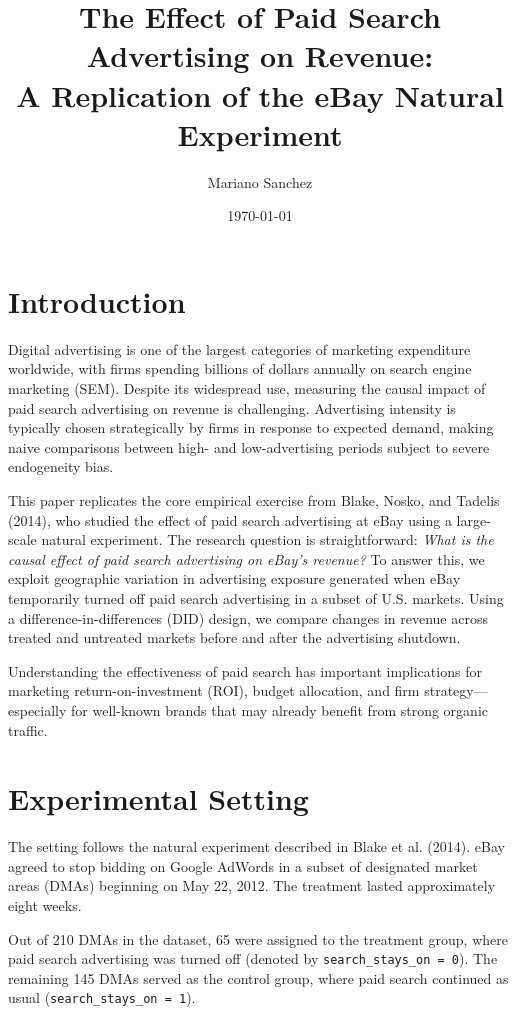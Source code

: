 \documentclass[12pt]{article}
\title{The Effect of Paid Search Advertising on Revenue: \\
	A Replication of the eBay Natural Experiment}
\author{Mariano Sanchez}
\date{\today}
\begin{document}
	\maketitle
	
	\section{Introduction}
	
	Digital advertising is one of the largest categories of marketing expenditure worldwide, with firms spending billions of dollars annually on search engine marketing (SEM). Despite its widespread use, measuring the causal impact of paid search advertising on revenue is challenging. Advertising intensity is typically chosen strategically by firms in response to expected demand, making naive comparisons between high- and low-advertising periods subject to severe endogeneity bias.
	
	This paper replicates the core empirical exercise from Blake, Nosko, and Tadelis (2014), who studied the effect of paid search advertising at eBay using a large-scale natural experiment. The research question is straightforward: \textit{What is the causal effect of paid search advertising on eBay’s revenue?} To answer this, we exploit geographic variation in advertising exposure generated when eBay temporarily turned off paid search advertising in a subset of U.S. markets. Using a difference-in-differences (DID) design, we compare changes in revenue across treated and untreated markets before and after the advertising shutdown.
	
	Understanding the effectiveness of paid search has important implications for marketing return-on-investment (ROI), budget allocation, and firm strategy—especially for well-known brands that may already benefit from strong organic traffic.
	
	\section{Experimental Setting}
	
	The setting follows the natural experiment described in Blake et al. (2014). eBay agreed to stop bidding on Google AdWords in a subset of designated market areas (DMAs) beginning on May 22, 2012. The treatment lasted approximately eight weeks. 
	
	Out of 210 DMAs in the dataset, 65 were assigned to the treatment group, where paid search advertising was turned off (denoted by \texttt{search\_stays\_on = 0}). The remaining 145 DMAs served as the control group, where paid search continued as usual (\texttt{search\_stays\_on = 1}).
	
\end{document}
